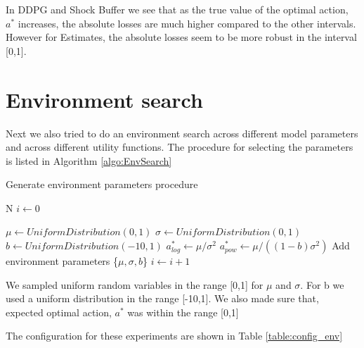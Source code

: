 In DDPG and Shock Buffer we see that as the true value of the optimal action, $a^*$  increases,  the absolute losses are much higher compared to the other intervals. However for Estimates, the absolute losses seem to be more robust in the interval [0,1].
\pagebreak

\section{Environment search}

Next we also tried to do an environment search across different model parameters and across different utility functions. The procedure for selecting the parameters is listed in Algorithm \ref{algo:EnvSearch}
\begin{algorithm}
\caption{Generate environment parameters procedure} \label{algo:EnvSearch}
\begin{algorithmic}[1]
\Require
\Statex N 
\Statex
\State $i \gets 0$

    \State $\mu \gets UniformDistribution(0,1)$
    \State $\sigma \gets UniformDistribution(0,1)$
    \State $b \gets UniformDistribution(-10,1)$
    \State  $a^*_{log} \gets \mu/\sigma^2$
    \State $a^*_{pow} \gets \mu/((1-b)\sigma^2)$
        \State Add environment parameters \{$\mu,\sigma,b$\}
        \State $i \gets i+1$
    \EndIf
\EndWhile
\end{algorithmic}
\end{algorithm}

We sampled uniform random variables in the range [0,1] for $\mu$ and $\sigma$. For b we used a uniform distribution in the range [-10,1]. We also made sure that, expected optimal action, $a^*$ was within the range [0,1]  

The configuration for these experiments are shown in Table \ref{table:config_env}

